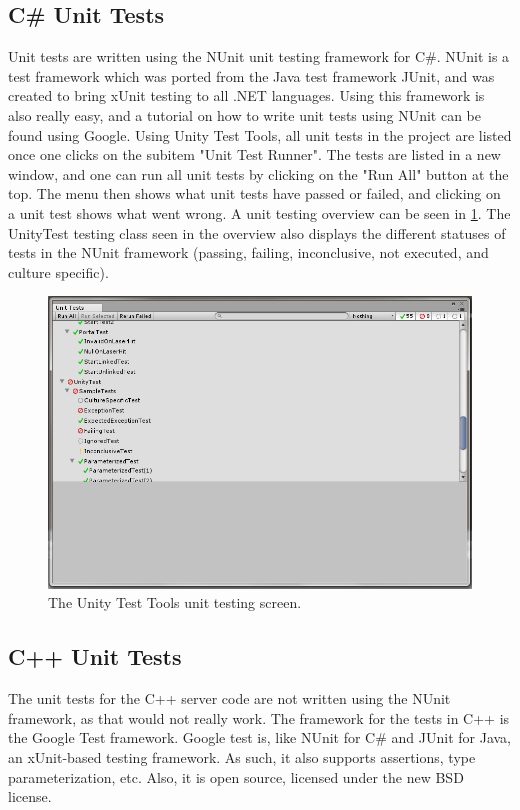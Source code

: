 		\subsection{C\# Unit Tests} \label{ssec:csharpunittests)}
			Unit tests are written using the NUnit unit testing framework for 
			C\#. NUnit is a test framework which was ported from the Java test 
			framework JUnit, and was created to bring xUnit testing to all .NET 
			languages. Using this framework is also really easy, and a tutorial 
			on how to write unit tests using NUnit can be found using Google. 
			Using Unity Test Tools, all unit tests in the project are listed 
			once one clicks on the subitem "Unit Test Runner". The tests are 
			listed in a new window, and one can run all unit tests by clicking 
			on the "Run All" button at the top. The menu then shows what unit 
			tests have passed or failed, and clicking on a unit test shows what 
			went wrong. A unit testing overview can be seen in \ref{fig:unitytesttools}.
			The UnityTest testing class seen in the overview also displays
			the different statuses of tests in the NUnit framework (passing,
			failing, inconclusive, not executed, and culture specific).
			
			\begin{figure}[!ht]
				\centering
				\includegraphics[width=\textwidth]{UnityTestTools}
				\caption{The Unity Test Tools unit testing screen.}
				\label{fig:unitytesttools}
			\end{figure}
			
		\subsection{C++ Unit Tests} \label{ssec:cplusplusunittests}
			The unit tests for the C++ server code are not written using the
			NUnit framework, as that would not really work. The framework for
			the tests in C++ is the Google Test framework. Google test is, like
			NUnit for C\# and JUnit for Java, an xUnit-based testing framework.
			As such, it also supports assertions, type parameterization, etc.
			Also, it is open source, licensed under the new BSD license.
			
